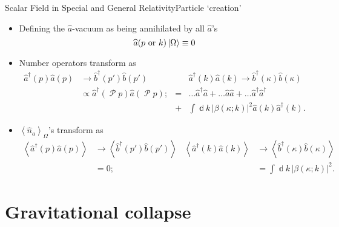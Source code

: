 \documentclass{beamer}
\newcommand{\abr}[1]{{\left<#1\right>}}
\newcommand{\vbr}[1]{{\left|#1\right|}}
\newcommand{\rfun}[2]{{#1}\mathopen{}\left(#2\right)\mathclose{}}
\newcommand{\dif}{\Bbbd}
\newcommand{\what}[1]{{\widehat{#1}}}
\begin{document}
\begin{frame}{Scalar Field in Special and General Relativity}{Particle
`creation'}
\begin{itemize}
\item Defining the $\what{a}$-vacuum as being annihilated by all $\hat{a}$'s
\[\rfun{\what{a}}{p\text{ or }k}\Ket{\Omega} \equiv 0\]
\item Number operators transform as
\begin{align*}
\rfun{\what{a}^\dagger}{p} \rfun{\what{a}}{p}
&\to \rfun{\what{b}^\dagger}{p'} \rfun{\what{b}}{p'}
&\phantom{}&\rfun{\what{a}^\dagger}{k} \rfun{\what{a}}{k} 
\to \rfun{\what{b}^\dagger}{\kappa} \rfun{\what{b}}{\kappa}\\
&\propto \rfun{\what{a}^\dagger}{\mscrP p} \rfun{\what{a}}{\mscrP p};
&=& \ldots \what{a}^\dagger \what{a} + \ldots \what{a} \what{a}
+ \ldots \what{a}^\dagger \what{a}^\dagger \\
&&+& \int \dif k\, \vbr{\rfun{\beta}{\kappa;k}}^2
\rfun{\what{a}}{k} \rfun{\what{a}^\dagger}{k}.
\end{align*}
\item $\abr{\what{n}_a}_\Omega$'s transform as
\begin{align*}
\abr{\rfun{\what{a}^\dagger}{p} \rfun{\what{a}}{p}}
&\to
\abr{\rfun{\what{b}^\dagger}{p'} \rfun{\what{b}}{p'}}
&
\abr{\rfun{\what{a}^\dagger}{k} \rfun{\what{a}}{k}}
&\to 
\abr{\rfun{\what{b}^\dagger}{\kappa} \rfun{\what{b}}{\kappa}}
\\
&= 0; &&= \int \dif k\, \vbr{\rfun{\beta}{\kappa;k}}^2.
\end{align*}
\end{itemize}

\end{frame}

\section{Gravitational collapse}
\end{document}
